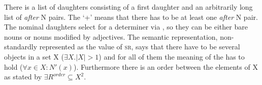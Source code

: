 \documentclass[output=paper]{langsci/langscibook}
\begin{document}
\z
There is a list of daughters consisting of a first daughter and an arbitrarily long list of
\emph{after} N pairs. The `+'\is{+} means that there has to be at least one \emph{after} N pair. The
nominal daughters select for a determiner via \spr, so they can be either bare nouns or nouns
modified by adjectives. The semantic representation, non-standardly represented as the value of
\textsc{sr}, says that there have to be several objects in a set X ($\exists X.|X| >1$) and for all of them the meaning
of the \nbar has to hold ($\forall x \in X:N'(x)$). Furthermore there is an order between the elements of X as stated by $\exists R^{order} \subseteq X^{2}$.
\end{document}

